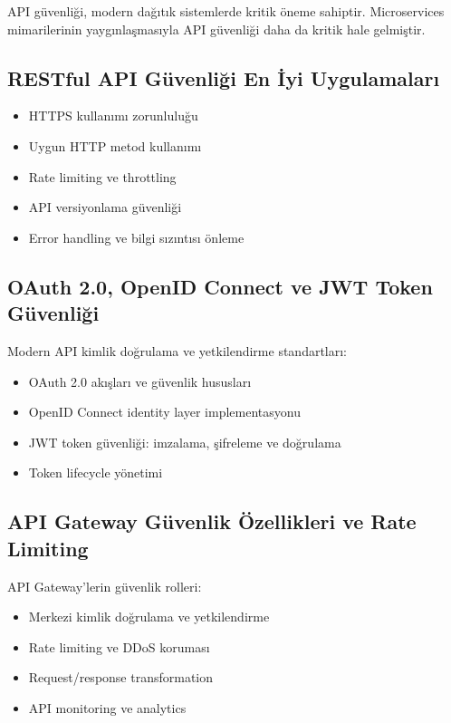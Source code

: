 API güvenliği, modern dağıtık sistemlerde kritik öneme sahiptir. Microservices mimarilerinin yaygınlaşmasıyla API güvenliği daha da kritik hale gelmiştir.

\subsection{RESTful API Güvenliği En İyi Uygulamaları}

\begin{itemize}
\item HTTPS kullanımı zorunluluğu
\item Uygun HTTP metod kullanımı
\item Rate limiting ve throttling
\item API versiyonlama güvenliği
\item Error handling ve bilgi sızıntısı önleme
\end{itemize}

\subsection{OAuth 2.0, OpenID Connect ve JWT Token Güvenliği}

Modern API kimlik doğrulama ve yetkilendirme standartları:

\begin{itemize}
\item OAuth 2.0 akışları ve güvenlik hususları
\item OpenID Connect identity layer implementasyonu
\item JWT token güvenliği: imzalama, şifreleme ve doğrulama
\item Token lifecycle yönetimi
\end{itemize}

\subsection{API Gateway Güvenlik Özellikleri ve Rate Limiting}

API Gateway'lerin güvenlik rolleri:

\begin{itemize}
\item Merkezi kimlik doğrulama ve yetkilendirme
\item Rate limiting ve DDoS koruması
\item Request/response transformation
\item API monitoring ve analytics
\end{itemize}

